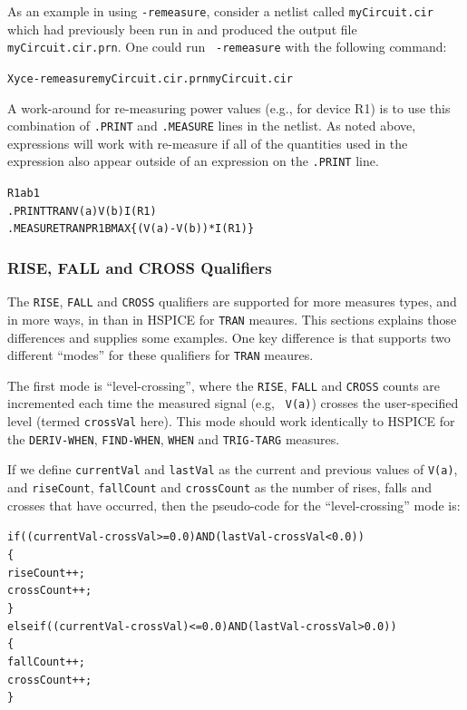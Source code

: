 As an example in using {\tt -remeasure}, consider a netlist called
{\tt myCircuit.cir} which had previously been run in \Xyce{} and
produced the output file {\tt myCircuit.cir.prn}.  One could run {\tt
-remeasure} with the following command:
\begin{alltt}
Xyce -remeasure myCircuit.cir.prn myCircuit.cir
\end{alltt}

A work-around for re-measuring power values (e.g., for device R1) is
to use this combination of {\tt .PRINT} and {\tt .MEASURE} lines in
the netlist.  As noted above, expressions will work with re-measure if
all of the quantities used in the expression also appear outside of an
expression on the {\tt .PRINT} line.
\begin{alltt}
R1 a b 1
.PRINT TRAN V(a) V(b) I(R1)
.MEASURE TRAN PR1B MAX \{(V(a)-V(b))*I(R1)\}
\end{alltt}

\subsubsection{RISE, FALL and CROSS Qualifiers}
The \texttt{RISE}, \texttt{FALL} and \texttt{CROSS} qualifiers are
supported for more measures types, and in more ways, in \Xyce{} than
in HSPICE for \texttt{TRAN} meaures.  This sections explains those
differences and supplies some examples.  One key difference is that
\Xyce{} supports two different ``modes'' for these qualifiers for
\texttt{TRAN} meaures.

The first mode is ``level-crossing'', where
the \texttt{RISE}, \texttt{FALL} and \texttt{CROSS} counts are
incremented each time the measured signal (e.g,
\texttt{ V(a)}) crosses the user-specified level (termed
\texttt{crossVal} here).  This mode should work identically to HSPICE
for the \texttt{DERIV-WHEN}, \texttt{FIND-WHEN}, \texttt{WHEN} and
\texttt{TRIG-TARG} measures.

If we define \texttt{currentVal} and \texttt{lastVal} as the current and previous
values of \texttt{V(a)}, and \texttt{riseCount},
\texttt{fallCount} and \texttt{crossCount} as the number of rises, falls and
crosses that have occurred, then the pseudo-code for the ``level-crossing'' mode is:
\begin{alltt}
if ( (currentVal-crossVal >= 0.0) AND (lastVal-crossVal < 0.0) )
\{
  riseCount++;
  crossCount++;
\}
else if( (currentVal-crossVal) <= 0.0) AND (lastVal-crossVal > 0.0) )
\{
  fallCount++;
  crossCount++;
\}
\end{alltt}

